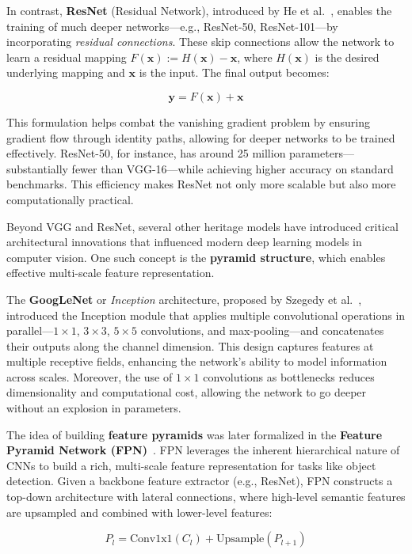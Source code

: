 In contrast, \textbf{ResNet} (Residual Network), introduced by He et al.~\cite{he2016deep}, enables the training of much deeper networks—e.g., ResNet-50, ResNet-101—by incorporating \emph{residual connections}. These skip connections allow the network to learn a residual mapping $F(\mathbf{x}) := H(\mathbf{x}) - \mathbf{x}$, where $H(\mathbf{x})$ is the desired underlying mapping and $\mathbf{x}$ is the input. The final output becomes:

\[
\mathbf{y} = F(\mathbf{x}) + \mathbf{x}
\]

This formulation helps combat the vanishing gradient problem by ensuring gradient flow through identity paths, allowing for deeper networks to be trained effectively. ResNet-50, for instance, has around 25 million parameters—substantially fewer than VGG-16—while achieving higher accuracy on standard benchmarks. This efficiency makes ResNet not only more scalable but also more computationally practical.  \cite{he2016deep}

Beyond VGG and ResNet, several other heritage models have introduced critical architectural innovations that influenced modern deep learning models in computer vision. One such concept is the \textbf{pyramid structure}, which enables effective multi-scale feature representation.

The \textbf{GoogLeNet} or \textit{Inception} architecture, proposed by Szegedy et al.~\cite{szegedy2015going}, introduced the Inception module that applies multiple convolutional operations in parallel—$1 \times 1$, $3 \times 3$, $5 \times 5$ convolutions, and max-pooling—and concatenates their outputs along the channel dimension. This design captures features at multiple receptive fields, enhancing the network’s ability to model information across scales. Moreover, the use of $1 \times 1$ convolutions as bottlenecks reduces dimensionality and computational cost, allowing the network to go deeper without an explosion in parameters.

The idea of building \textbf{feature pyramids} was later formalized in the \textbf{Feature Pyramid Network (FPN)}~\cite{lin2017feature}. FPN leverages the inherent hierarchical nature of CNNs to build a rich, multi-scale feature representation for tasks like object detection. Given a backbone feature extractor (e.g., ResNet), FPN constructs a top-down architecture with lateral connections, where high-level semantic features are upsampled and combined with lower-level features:

\[
P_l = \text{Conv1x1}(C_l) + \text{Upsample}(P_{l+1})
\]

